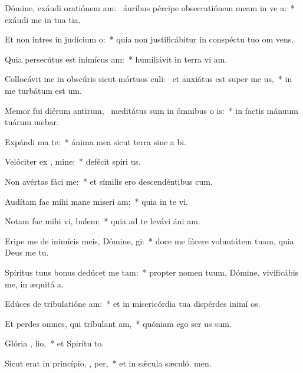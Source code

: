 \item Dómine, exáudi oratiónem am:~\pscross{} áuribus pércipe obsecratiónem meam in ve a:~* exáudi me in tua tia.
\item Et non intres in judícium   o:~* quia non justificábitur in conspéctu tuo om vens.
\item Quia persecútus est inimícus  am:~* humiliávit in terra vi am.
\item Collocávit me in obscúris sicut mórtuos culi:~\pscross{} et anxiátus est super me  us,~* in me turbátum est  um.
\item Memor fui diérum antirum,~\pscross{} meditátus sum in ómnibus o is:~* in factis mánuum tuárum mebar.
\item Expándi ma   te:~* ánima mea sicut terra sine a bi.
\item Velóciter ex , mine:~* defécit spíri us.
\item Non avértas fáci   me:~* et símilis ero descendéntibus  cum.
\item Audítam fac mihi mane miseri am:~* quia in te vi.
\item Notam fac mihi vi,   bulem:~* quia ad te levávi áni am.
\item Eripe me de inimícis meis, Dómine,   gi:~* doce me fácere voluntátem tuam, quia Deus me  tu.
\item Spíritus tuus bonus dedúcet me   tam:~* propter nomen tuum, Dómine, vivificábis me, in æquitá a.
\item Edúces de tribulatióne  am:~* et in misericórdia tua dispérdes inimí os.
\item Et perdes omnes, qui tríbulant  am,~* quóniam ego ser us sum.
\item Glória ,  lio,~* et Spirítu to.
\item Sicut erat in princípio,  ,  per,~* et in sǽcula sæculó. men.
